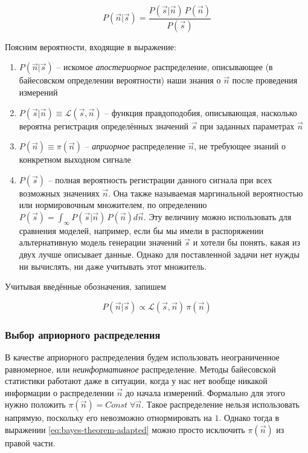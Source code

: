 \documentclass[12pt]{book}
\begin{document}
	\begin{equation}
		P(\vec{n} | \vec{s}) = \frac{P(\vec{s} | \vec{n}) \, P(\vec{n})}{P(\vec{s})}
	\end{equation}

	Поясним вероятности, входящие в выражение: 
	
	\begin{enumerate}
		\item $P(\vec{n} | \vec{s})$ -- искомое \textit{апостериорное} распределение, описывающее (в байесовском определении вероятности) наши знания о $\vec{n}$ после проведения измерений
		\item $P(\vec{s} | \vec{n}) \equiv \mathcal{L}(\vec{s}, \vec{n})$ -- функция правдоподобия, описывающая, насколько вероятна регистрация определённых значений $\vec{s}$ при заданных параметрах $\vec{n}$
		\item $P(\vec{n}) \equiv \pi(\vec{n})$ -- \textit{априорное} распределение $\vec{n}$, не требующее знаний о конкретном выходном сигнале
		\item $P(\vec{s})$ -- полная вероятность регистрации данного сигнала при всех возможных значениях $\vec{n}$. Она также называемая маргинальной вероятностью или нормировочным множителем, по определению $P(\vec{s}) = \int_{\infty} P(\vec{s} | \vec{n}) \, P(\vec{n}) d\vec{n}$. Эту величину можно использовать для сравнения моделей, например, если бы мы имели в распоряжении альтернативную модель генерации значений $\vec{s}$ и хотели бы понять, какая из двух лучше описывает данные. Однако для поставленной задачи нет нужды ни вычислять, ни даже учитывать этот множитель.
	\end{enumerate}

	Учитывая введённые обозначения, запишем

	\begin{equation}
		\label{eq:bayes-theorem-adapted}
		P(\vec{n} | \vec{s}) \propto \mathcal{L}(\vec{s}, \vec{n}) \, \pi(\vec{n})
	\end{equation}

	\subsubsection{Выбор априорного распределения}
	
	В качестве априорного распределения будем использовать неограниченное равномерное, или \textit{неинформативное} распределение. Методы байесовской статистики работают даже в ситуации, когда у нас нет вообще никакой информации о распределении $\vec{n}$ до начала измерений. Формально для этого нужно положить $\pi(\vec{n}) = Const \; \forall \vec{n}$. Такое распределение нельзя использовать напрямую, поскольку его невозможно отнормировать на $1$. Однако тогда в выражении \ref{eq:bayes-theorem-adapted} можно просто исключить $\pi(\vec{n})$ из правой части.
	
\end{document}
